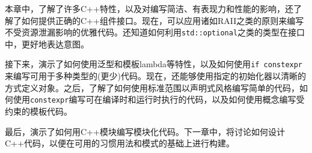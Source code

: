 本章中，了解了许多C++特性，以及对编写简洁、有表现力和性能的影响，还了解了如何提供正确的C++组件接口。现在，可以应用诸如RAII之类的原则来编写不受资源泄漏影响的优雅代码。还知道如何利用\texttt{std::optional}之类的类型在接口中，更好地表达意图。

接下来，演示了如何使用泛型和模板lambda等特性，以及如何使用\texttt{if constexpr}来编写可用于多种类型的(更少)代码。现在，还能够使用指定的初始化器以清晰的方式定义对象。之后，了解了如何使用标准范围以声明式风格编写简单的代码，如何使用\texttt{constexpr}编写可在编译时和运行时执行的代码，以及如何使用概念编写受约束的模板代码。

最后，演示了如何用C++模块编写模块化代码。下一章中，将讨论如何设计C++代码，以便在可用的习惯用法和模式的基础上进行构建。